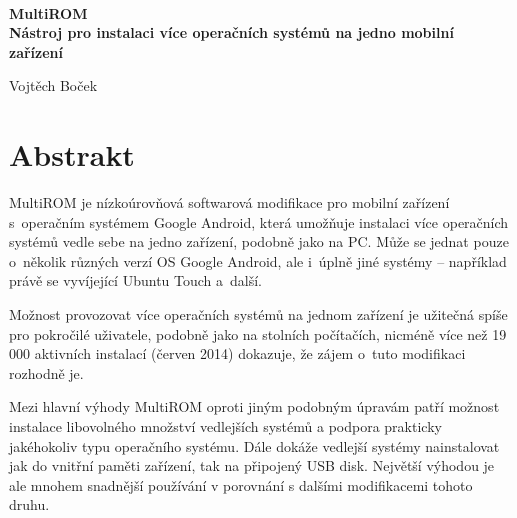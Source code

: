 \documentclass[12pt, a4paper, oneside]{article}
\newcommand{\B}{\textbf} %
\begin{document}
\pagestyle{empty} %
~
\vspace{-20mm}
\begin{center}

\Large
\B{MultiROM \\ Nástroj pro instalaci více operačních systémů na jedno mobilní zařízení}
\large

Vojtěch Boček

\end{center}

\section*{Abstrakt}
MultiROM je nízkoúrovňová softwarová modifikace pro mobilní zařízení s~operačním systémem Google Android, která umožňuje instalaci více operačních systémů vedle sebe na jedno zařízení, podobně jako na PC. Může se jednat pouze o~několik různých verzí OS Google Android, ale i~úplně jiné systémy -- například právě se vyvíjející Ubuntu Touch a~další.

Možnost provozovat více operačních systémů na jednom zařízení je užitečná spíše pro pokročilé uživatele, podobně jako na stolních počítačích, nicméně více než 19 000 aktivních instalací (červen 2014) dokazuje, že zájem o~tuto modifikaci rozhodně je.

Mezi hlavní výhody MultiROM oproti jiným podobným úpravám patří možnost instalace libovolného množství vedlejších systémů a podpora prakticky jakéhokoliv typu operačního systému. Dále dokáže vedlejší systémy nainstalovat jak do vnitřní paměti zařízení, tak na připojený USB disk. Největší výhodou je ale mnohem snadnější používání v porovnání s dalšími modifikacemi tohoto druhu.
\end{document}
